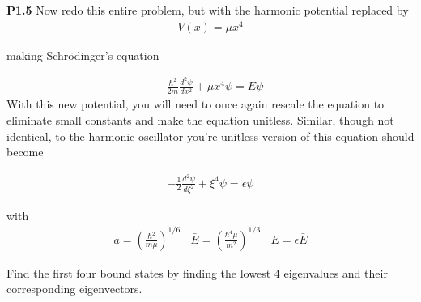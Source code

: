 \vspace{0.25in}
\begin{minipage}{0.9\linewidth}
\noindent\textbf{P1.5}
Now redo this entire problem, but with the harmonic potential replaced
by
\begin{align}
V(x)  = \mu x^4
\end{align} 

making Schr\"{o}dinger's equation

\begin{align}
-\frac{\hbar^2}{2m} \frac{d^2\psi}{dx^2} + \mu x^4 \psi = E \psi
\end{align}
With this new potential, you will need to once again rescale the
equation to eliminate small constants and make the equation unitless.
Similar, though not identical, to the harmonic oscillator you're
unitless version of this equation should become

\begin{align}
-\frac{1}{2} \frac{d^2\psi}{d\xi^2} + \xi^4 \psi = \epsilon \psi
\end{align}

with 
\begin{align}
a = \left( \frac{\hbar^2}{m \mu}\right)^{1/6} ~~~~ \bar{E} = \left( \frac{\hbar^4\mu}{m^2}\right)^{1/3} ~~~~E = \epsilon \bar{E}
\end{align}

Find the first four bound states by finding the lowest 4 eigenvalues
and their corresponding eigenvectors.

\end{minipage}




